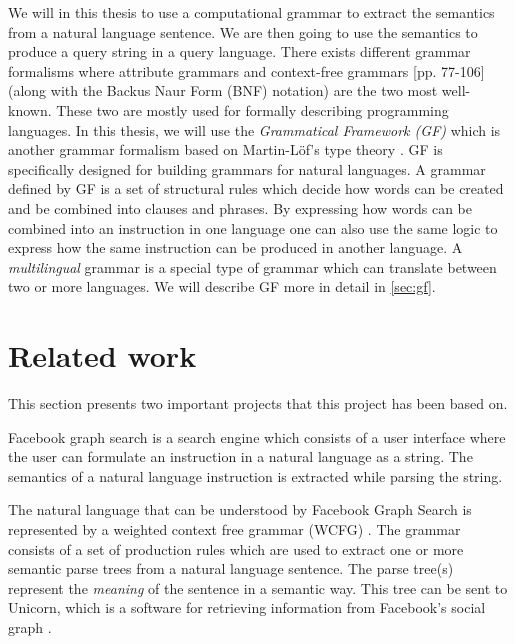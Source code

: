 We will in this thesis to use a computational grammar to extract the semantics from a natural language sentence. We are then going to use the semantics to produce a query string in a query language.
\newline
\newline
There exists different grammar formalisms where attribute grammars \cite{knuth:1968} and context-free grammars \cite{Hopcroft:1990:IAT:574901}[pp. 77-106] (along with the Backus Naur Form (BNF) \cite{Knuth:1964:BNF:355588.365140} notation) are the two most well-known. These two are mostly used for formally describing programming languages.
\newline
\newline
In this thesis, we will use the \emph{Grammatical Framework (GF)} which is another grammar formalism \cite{ranta:2004} based on Martin-Löf's type theory \cite{Martin-lof}. GF is specifically designed for building grammars for natural languages.
\newline
\newline
A grammar defined by GF is a set of structural rules which decide how words can be created and be combined into clauses and phrases. By expressing how words can be combined into an instruction in one language one can also use the same logic to express how the same instruction can be produced in another language. A \emph{multilingual} grammar is a special type of grammar which can translate between two or more languages. We will describe GF more in detail in \autoref{sec:gf}.

\section{Related work}
This section presents two important projects that this project has been based on.

Facebook graph search \cite{unicorn} is a search engine which consists of a user interface where the user can formulate an instruction in a natural language as a string. The semantics of a natural language instruction is extracted while parsing the string.

The natural language that can be understood by Facebook Graph Search is represented by a weighted context free grammar (WCFG) \cite{li:2013}. The grammar consists of a set of production rules which are used to extract one or more semantic parse trees from a natural language sentence. The parse tree(s) represent the \emph{meaning} of the sentence in a semantic way. This tree can be sent to Unicorn, which is a software for retrieving information from Facebook's social graph \cite{unicorn}.

